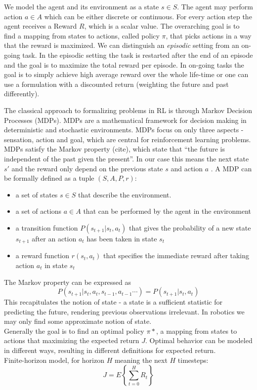 We model the agent and its environment as a state $s \in S$. The agent
may perform action $ a \in A$ which can be either discrete or continuous.
For every action step the agent receives a Reward $R$,
which is a scalar value.
The overarching goal is to find a mapping from states to actions,
called policy $\pi$, that picks actions in a way that
the reward is maximized.
We can distinguish an \textit{episodic} setting
from an on-going task.
In the episodic setting
the task is restarted after
the end of an episode and the goal is
to maximize the total reward per episode.
In on-going tasks the goal
is to simply achieve high average reward over
the whole life-time or one can use a formulation
with a discounted return (weighting the
future and past differently).

The classical approach to formalizing problems in RL is through
Markov Decision Processes (MDPs).
MDPs are a mathematical
framework for decision making in deterministic and stochastic environments.
MDPs focus on only three aspects
- sensation, action and goal, which are central
for reinforcement learning problems.
MDPs satisfy the Markov property (cite), which state that ``the future is independent
of the past given the present''. In our case this means the next state $s'$ and the reward
only depend on the previous state $s$ and action $a$ \citet{sutton1992reinforcement}.
A MDP can be formally defined as a tuple $(S, A, P, r)$:

\begin{itemize}
\item a set of states $s \in S$ that describe the environment.
\item a set of actions $a \in A$ that can be performed by the agent in the environment
\item a transition function $P(s_{t+1} | s_t, a_t)$ that gives the probability of a new
  state $s_{t+1}$ after an action $a_t$ has been taken in state $s_t$
\item a reward function $r(s_t, a_t)$ that specifies the immediate reward after taking action
  $a_t$ in state $s_t$
\end{itemize}

The Markov property can be expressed as
$$ P(s_{t+1} | s_t, a_t, s_{t-1}, a_{t-1}\cdots) = P(s_{t+1} | s_t, a_t)$$
This recapitulates the notion of state - a state is a sufficient statistic
for predicting the future, rendering previous observations irrelevant.
In robotics we may only find some approximate notion of state. \\
Generally the goal is to find an optimal policy $\pi*$,
a mapping from states to actions that
maximizing the expected return $J$.
Optimal behavior can be modeled in
different ways, resulting in different
definitions for expected return. \\
Finite-horizon model, for horizon $H$ meaning the next $H$ timesteps:
$$ J = E \left\{\sum^H_{t=0} R_t \right\} $$

